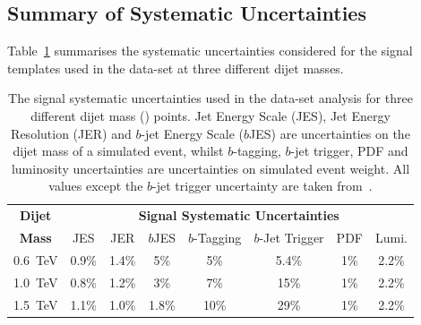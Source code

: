 \FloatBarrier
\subsection{Summary of Systematic Uncertainties}
\label{sec:lim-full_systs}

Table~\ref{tab:lim-lowmass_syst} summarises the systematic uncertainties considered for the
signal templates used in the \lm{} data-set at three different dijet masses.

\begin{table}[!htb]
  \centering
  \begin{tabular}{|c||c|c|c|c|c|c|c|}
    \hline
    \textbf{Dijet}   & \multicolumn{7}{c|}{\textbf{Signal Systematic Uncertainties}}                    \\ \cline{2-8} 
    \textbf{Mass}    & JES   & JER   & $b$JES  & $b$-Tagging & $b$-Jet Trigger & PDF & Lumi.        \\
    \hline                                                                        
    0.6~TeV          & 0.9\% & 1.4\% & 5\%     &     5\%     &      5.4\%   & 1\% & 2.2\%       \\
    1.0~TeV          & 0.8\% & 1.2\% & 3\%     &     7\%     &       15\%   & 1\% & 2.2\%       \\
    1.5~TeV          & 1.1\% & 1.0\% & 1.8\%    &    10\%     &       29\%   & 1\% & 2.2\%       \\
    \hline
  \end{tabular}
  \caption[The signal systematic uncertainties used in the \lm{} data-set analysis.]
          {The signal systematic uncertainties used in the \lm{} data-set analysis
           for three different dijet mass (\mjj{}) points.
          Jet Energy Scale (JES), Jet Energy Resolution (JER) and $b$-jet Energy Scale ($b$JES)
          are uncertainties on the dijet mass of a simulated event,
          whilst $b$-tagging, $b$-jet trigger, PDF and luminosity uncertainties are uncertainties on simulated event weight.
          All values except the $b$-jet trigger uncertainty are taken from~\cite{dibjet-full}.}
  \label{tab:lim-lowmass_syst}
  \end{table}

